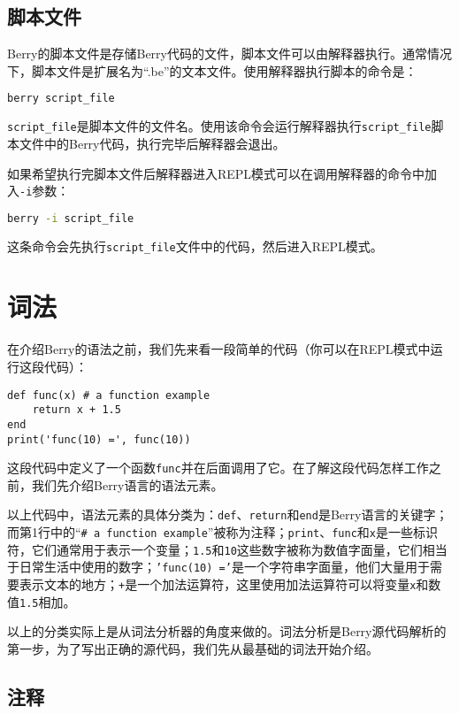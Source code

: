 \subsection{脚本文件}

Berry的脚本文件是存储Berry代码的文件，脚本文件可以由解释器执行。通常情况下，脚本文件是扩展名为``.be''的文本文件。使用解释器执行脚本的命令是：
\begin{lstlisting}[language=bash, numbers=none]
berry script_file
\end{lstlisting}
\texttt{script\_file}是脚本文件的文件名。使用该命令会运行解释器执行\texttt{script\_file}脚本文件中的Berry代码，执行完毕后解释器会退出。

如果希望执行完脚本文件后解释器进入REPL模式可以在调用解释器的命令中加入\texttt{-i}参数：
\begin{lstlisting}[language=bash, numbers=none]
berry -i script_file
\end{lstlisting}
这条命令会先执行\texttt{script\_file}文件中的代码，然后进入REPL模式。

\section{词法}

在介绍Berry的语法之前，我们先来看一段简单的代码（你可以在REPL模式中运行这段代码）：
\begin{lstlisting}[language=berry]
def func(x) # a function example
    return x + 1.5
end
print('func(10) =', func(10))
\end{lstlisting}

这段代码中定义了一个函数\texttt{func}并在后面调用了它。在了解这段代码怎样工作之前，我们先介绍Berry语言的语法元素。

以上代码中，语法元素的具体分类为：\texttt{def}、\texttt{return}和\texttt{end}是Berry语言的关键字；而第1行中的``\texttt{\# a function example}''被称为注释；\texttt{print}、\texttt{func}和\texttt{x}是一些标识符，它们通常用于表示一个变量；\texttt{1.5}和\texttt{10}这些数字被称为数值字面量，它们相当于日常生活中使用的数字；\texttt{'func(10) ='}是一个字符串字面量，他们大量用于需要表示文本的地方；\texttt{+}是一个加法运算符，这里使用加法运算符可以将变量\texttt{x}和数值\texttt{1.5}相加。

以上的分类实际上是从词法分析器的角度来做的。词法分析是Berry源代码解析的第一步，为了写出正确的源代码，我们先从最基础的词法开始介绍。

\subsection{注释}

